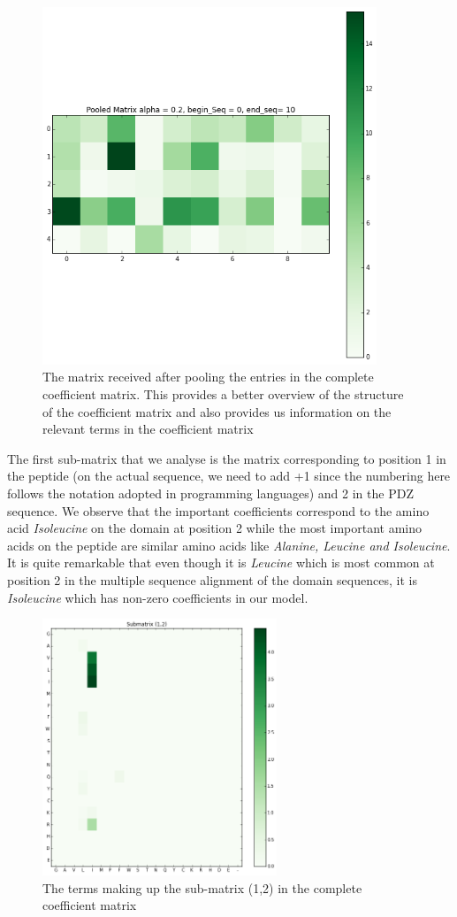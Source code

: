 \documentclass[a4paper, 12pt]{article}
\begin{document}
\begin{enumerate}
\begin{figure}[!h]
\centering 
\label{pooled_matrix}
\includegraphics[width=10cm]{Images/pooled_matrix_seq_10.png}
\caption{The matrix received after pooling the entries in the complete coefficient matrix. This provides a better overview of the structure of the coefficient matrix and also provides us information on the relevant terms in the coefficient matrix}
\end{figure} 

The first sub-matrix that we analyse is the matrix corresponding to position 1 in the peptide (on the actual sequence, we need to add +1 since the numbering here follows the notation adopted in programming languages) and 2 in the PDZ sequence. We observe that the important coefficients correspond to the amino acid \emph{Isoleucine} on the domain at position 2 while the most important amino acids on the peptide are similar amino acids like \emph{Alanine, Leucine and Isoleucine}. It is quite remarkable that even though it is \emph{Leucine} which is most common at position 2 in the multiple sequence alignment of the domain sequences, it is \emph{Isoleucine} which has non-zero coefficients in our model. 

\begin{figure}[!h]
\centering
\label{submatrix_12}
\includegraphics[width=7cm]{Images/submatrix_12.png}
\caption{The terms making up the sub-matrix (1,2) in the complete coefficient matrix}
\end{figure}


\end{enumerate}
\end{document}
